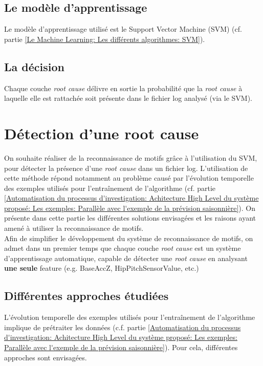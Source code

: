 \subsection{Le modèle d'apprentissage}
\label{Automatisation du processus d'investigation: Achitecture High Level du système proposé: Le modèle d'apprentissage}
Le modèle d'apprentissage utilisé est le Support Vector Machine (SVM) (cf. partie \ref{Le Machine Learning: Les différents algorithmes: SVM}).


\subsection{La décision}
\label{Automatisation du processus d'investigation: Achitecture High Level du système proposé: La décision}
Chaque couche \emph{root cause} délivre en sortie la probabilité que la \emph{root cause} à laquelle elle est rattachée soit présente dans le fichier log analysé (via le SVM).



\section{Détection d'une root cause}
\label{Automatisation du processus d'investigation: Détection d'une root cause}
On souhaite réaliser de la reconnaissance de motifs grâce à l'utilisation du SVM, pour détecter la présence d'une \emph{root cause} dans un fichier log. L'utilisation de cette méthode répond notamment au problème causé par l'évolution temporelle des exemples utilisés pour l'entraînement de l'algorithme (cf. partie \ref{Automatisation du processus d'investigation: Achitecture High Level du système proposé: Les exemples: Parallèle avec l'exemple de la prévision saisonnière}). On présente dans cette partie les différentes solutions envisagées et les raisons ayant amené à utiliser la reconnaissance de motifs. \\

Afin de simplifier le développement du système de reconnaissance de motifs, on admet dans un premier temps que chaque couche \emph{root cause} est un système d'apprentissage automatique, capable de détecter une \emph{root cause} en analysant \textbf{une seule} feature (e.g. BaseAccZ, HipPitchSensorValue, etc.) 

\subsection{Différentes approches étudiées}
\label{Automatisation du processus d'investigation: Reconnaissance de motifs: Différentes approches étudiées}
L'évolution temporelle des exemples utilisés pour l'entraînement de l'algorithme implique de prétraiter les données (c.f. partie \ref{Automatisation du processus d'investigation: Achitecture High Level du système proposé: Les exemples: Parallèle avec l'exemple de la prévision saisonnière}). Pour cela, différentes approches sont envisagées.

